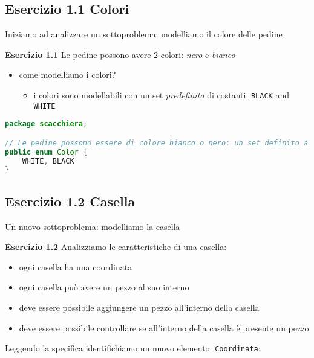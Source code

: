\documentclass{article}
\begin{document}
\subsection{Esercizio 1.1 Colori}
Iniziamo ad analizzare un sottoproblema: modelliamo il colore delle pedine
\begin{framed}
\textbf{Esercizio 1.1} Le pedine possono avere $2$ colori: \emph{nero} e \emph{bianco}
\end{framed}
\begin{itemize}
\item come modelliamo i colori?
\begin{itemize}
\item i colori sono modellabili con un set \emph{predefinito} di costanti: \texttt{BLACK} and \texttt{WHITE}
\end{itemize}
\end{itemize}

\begin{lstlisting}[language=Java,escapechar=|]
package scacchiera;

// Le pedine possono essere di colore bianco o nero: un set definito a priori E NON modificabile di valori
public enum Color {
	WHITE, BLACK
}
\end{lstlisting}

\subsection{Esercizio 1.2 Casella}
Un nuovo sottoproblema: modelliamo la casella
\begin{framed}
\textbf{Esercizio 1.2} Analizziamo le caratteristiche di una casella:
\begin{itemize}
\item ogni casella ha una coordinata
\item ogni casella pu\`o avere un pezzo al suo interno
\item deve essere possibile aggiungere un pezzo all'interno della casella
\item deve essere possibile controllare se all'interno della casella \`e presente un pezzo
\end{itemize}
\end{framed}

Leggendo la specifica identifichiamo un nuovo elemento: \texttt{Coordinata}: 
\end{document}
